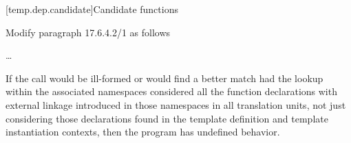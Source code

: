 [temp.dep.candidate]{Candidate functions}

\noindent
Modify paragraph 17.6.4.2/1 as follows
\begin{std.txt}
  \resetalinea[0]
  \alinea
  \ldots

  If the call would be ill-formed or would find a better match had the 
  lookup within the associated namespaces considered all the function 
  declarations with external   
  linkage introduced in those namespaces in all 
  translation units, not just considering those declarations found in the 
  template definition and template instantiation contexts, then the program 
  has undefined behavior.
\end{std.txt}




